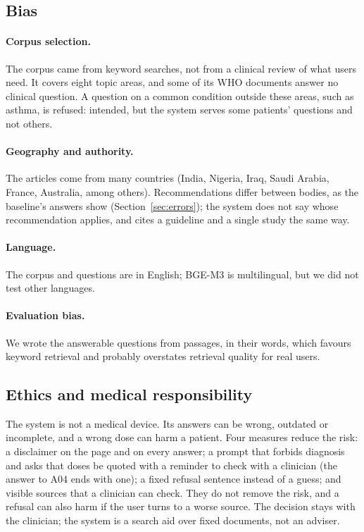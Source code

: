 \subsection{Bias}

\paragraph{Corpus selection.} The corpus came from keyword searches, not from a clinical review of what users need. It covers eight topic areas, and some of its WHO documents answer no clinical question. A question on a common condition outside these areas, such as asthma, is refused: intended, but the system serves some patients' questions and not others.

\paragraph{Geography and authority.} The articles come from many countries (India, Nigeria, Iraq, Saudi Arabia, France, Australia, among others). Recommendations differ between bodies, as the baseline's answers show (Section~\ref{sec:errors}); the system does not say whose recommendation applies, and cites a guideline and a single study the same way.

\paragraph{Language.} The corpus and questions are in English; BGE-M3 is multilingual, but we did not test other languages.

\paragraph{Evaluation bias.} We wrote the answerable questions from passages, in their words, which favours keyword retrieval and probably overstates retrieval quality for real users.

\subsection{Ethics and medical responsibility}

The system is not a medical device. Its answers can be wrong, outdated or incomplete, and a wrong dose can harm a patient. Four measures reduce the risk: a disclaimer on the page and on every answer; a prompt that forbids diagnosis and asks that doses be quoted with a reminder to check with a clinician (the answer to A04 ends with one); a fixed refusal sentence instead of a guess; and visible sources that a clinician can check. They do not remove the risk, and a refusal can also harm if the user turns to a worse source. The decision stays with the clinician; the system is a search aid over fixed documents, not an adviser.

